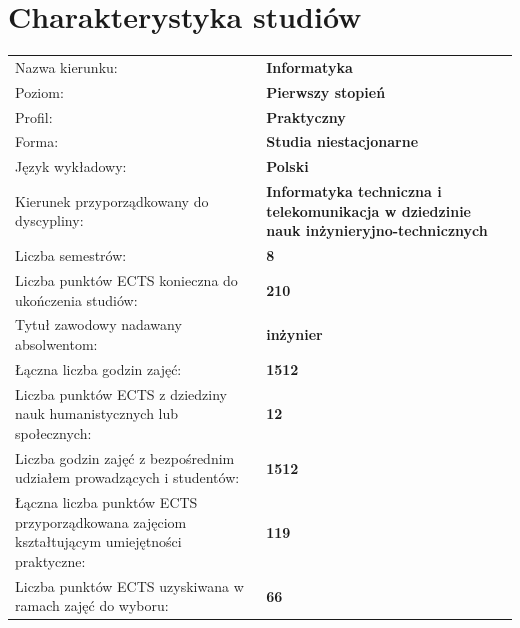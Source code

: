 \documentclass[12pt,a4paper]{article}
\renewcommand{\arraystretch}{1.35}
\begin{document}
\vspace{1cm}
\thispagestyle{empty}
\newpage
\setcounter{page}{1}

\tableofcontents
\newpage

\section{Charakterystyka studiów}

{\renewcommand{\arraystretch}{1.4}
\begin{tabularx}{\textwidth}{@{}Xp{8.5cm}@{}}
\toprule
  {\small Nazwa kierunku:} & {\small\textbf{Informatyka}} \\
  {\small Poziom:} & {\small\textbf{Pierwszy stopień}} \\
  {\small Profil:} & {\small\textbf{Praktyczny}} \\
  {\small Forma:} & {\small\textbf{Studia niestacjonarne}} \\
  {\small Język wykładowy:} & {\small\textbf{Polski}} \\
  {\small Kierunek przyporządkowany do dyscypliny:} & {\small\textbf{Informatyka techniczna i telekomunikacja w dziedzinie nauk inżynieryjno-technicznych}} \\
\midrule
  {\small Liczba semestrów:} & {\small\textbf{8}} \\
  {\small Liczba punktów ECTS konieczna do ukończenia studiów:} & {\small\textbf{210}} \\
  {\small Tytuł zawodowy nadawany absolwentom:} & {\small\textbf{inżynier}} \\
\midrule
  {\small Łączna liczba godzin zajęć:} & {\small\textbf{1512}} \\
  {\small Liczba punktów ECTS z dziedziny nauk humanistycznych lub społecznych:} & {\small\textbf{12}} \\
  {\small Liczba godzin zajęć z bezpośrednim udziałem prowadzących i studentów:} & {\small\textbf{1512}} \\
  {\small Łączna liczba punktów ECTS przyporządkowana zajęciom kształtującym umiejętności praktyczne:} & {\small\textbf{119}} \\
  {\small Liczba punktów ECTS uzyskiwana w ramach zajęć do wyboru:} & {\small\textbf{66}} \\
\bottomrule
\end{tabularx}}

\bigskip
\end{document}
